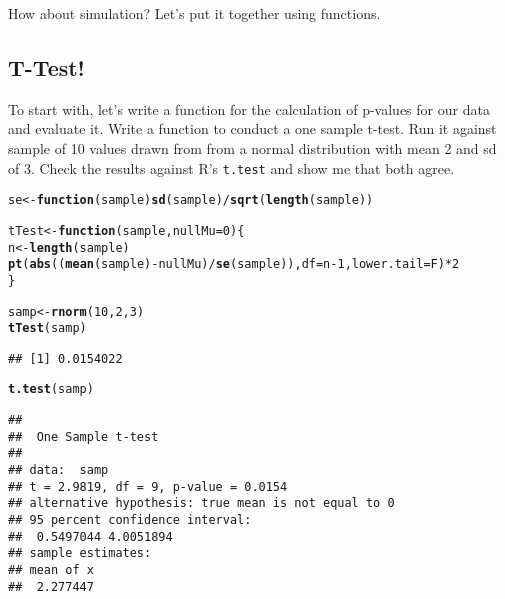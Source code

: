\documentclass{article}\usepackage[]{graphicx}\usepackage[]{color}
\makeatletter
\newcommand{\hlnum}[1]{\textcolor[rgb]{0.686,0.059,0.569}{#1}}%
\newcommand{\hlopt}[1]{\textcolor[rgb]{0,0,0}{#1}}%
\newcommand{\hlstd}[1]{\textcolor[rgb]{0.345,0.345,0.345}{#1}}%
\newcommand{\hlkwa}[1]{\textcolor[rgb]{0.161,0.373,0.58}{\textbf{#1}}}%
\newcommand{\hlkwb}[1]{\textcolor[rgb]{0.69,0.353,0.396}{#1}}%
\newcommand{\hlkwc}[1]{\textcolor[rgb]{0.333,0.667,0.333}{#1}}%
\newcommand{\hlkwd}[1]{\textcolor[rgb]{0.737,0.353,0.396}{\textbf{#1}}}%
\newenvironment{kframe}{%
 \def\at@end@of@kframe{}%
 \ifinner\ifhmode%
  \def\at@end@of@kframe{\end{minipage}}%
  \begin{minipage}{\columnwidth}%
 \fi\fi%
 \def\FrameCommand##1{\hskip\@totalleftmargin \hskip-\fboxsep
 \colorbox{shadecolor}{##1}\hskip-\fboxsep
     \hskip-\linewidth \hskip-\@totalleftmargin \hskip\columnwidth}%
 \MakeFramed {\advance\hsize-\width
   \@totalleftmargin\z@ \linewidth\hsize
   \@setminipage}}%
 {\par\unskip\endMakeFramed%
 \at@end@of@kframe}
\newenvironment{knitrout}{}{} %
\makeatother
\begin{document}
How about simulation?  Let's put it together using functions.
\subsection{T-Test!}
To start with, let's write a function for the calculation of p-values for our data and evaluate it.  Write a function to conduct a one sample t-test.  Run it against sample of 10 values drawn from from a normal distribution with mean 2 and sd of 3.  Check the results against R's {\tt t.test} and show me that both agree.


\begin{knitrout}
\color{fgcolor}\begin{kframe}
\begin{alltt}
\hlstd{se} \hlkwb{<-} \hlkwa{function}\hlstd{(}\hlkwc{sample}\hlstd{)} \hlkwd{sd}\hlstd{(sample)}\hlopt{/}\hlkwd{sqrt}\hlstd{(}\hlkwd{length}\hlstd{(sample))}

\hlstd{tTest} \hlkwb{<-} \hlkwa{function}\hlstd{(}\hlkwc{sample}\hlstd{,} \hlkwc{nullMu}\hlstd{=}\hlnum{0}\hlstd{)\{}
  \hlstd{n}\hlkwb{<-}\hlkwd{length}\hlstd{(sample)}
  \hlkwd{pt}\hlstd{(}\hlkwd{abs}\hlstd{((}\hlkwd{mean}\hlstd{(sample)}\hlopt{-}\hlstd{nullMu)}\hlopt{/}\hlkwd{se}\hlstd{(sample)),} \hlkwc{df}\hlstd{=n}\hlopt{-}\hlnum{1}\hlstd{,} \hlkwc{lower.tail}\hlstd{=F)} \hlopt{*} \hlnum{2}
\hlstd{\}}

\hlstd{samp}\hlkwb{<-}\hlkwd{rnorm}\hlstd{(}\hlnum{10}\hlstd{,}\hlnum{2}\hlstd{,}\hlnum{3}\hlstd{)}
\hlkwd{tTest}\hlstd{(samp)}
\end{alltt}
\begin{verbatim}
## [1] 0.0154022
\end{verbatim}
\begin{alltt}
\hlkwd{t.test}\hlstd{(samp)}
\end{alltt}
\begin{verbatim}
## 
## 	One Sample t-test
## 
## data:  samp
## t = 2.9819, df = 9, p-value = 0.0154
## alternative hypothesis: true mean is not equal to 0
## 95 percent confidence interval:
##  0.5497044 4.0051894
## sample estimates:
## mean of x 
##  2.277447
\end{verbatim}
\end{kframe}
\end{knitrout}
\end{document}
